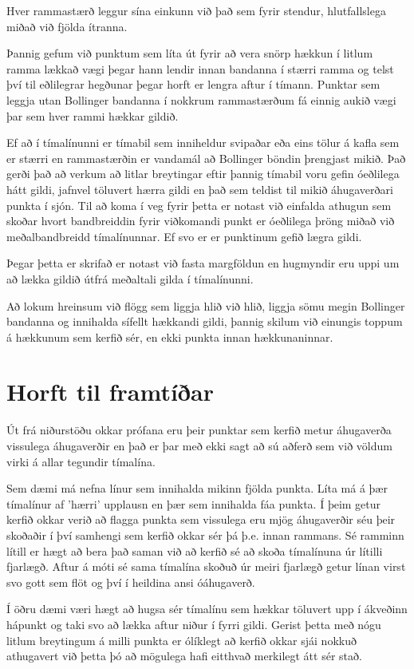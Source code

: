 \documentclass{article}
\begin{document}
Hver rammastærð leggur sína einkunn við það sem fyrir stendur, hlutfallslega miðað við fjölda ítranna.

Þannig gefum við punktum sem líta út fyrir að vera
snörp hækkun í litlum ramma lækkað vægi þegar hann
lendir innan bandanna í stærri ramma
og telst því til eðlilegrar hegðunar þegar horft er
lengra aftur í tímann.
Punktar sem leggja utan Bollinger bandanna í nokkrum
rammastærðum fá einnig aukið vægi þar sem hver rammi
hækkar gildið.

Ef að í tímalínunni er tímabil sem inniheldur svipaðar
eða eins tölur á kafla sem er stærri en rammastærðin er
vandamál að Bollinger 
böndin þrengjast mikið. Það gerði það að verkum að
litlar breytingar eftir þannig tímabil voru gefin
óeðlilega hátt gildi, 
jafnvel töluvert hærra gildi en það sem teldist til
mikið áhugaverðari punkta í sjón. Til að koma í veg
fyrir þetta er notast við
einfalda athugun sem skoðar hvort bandbreiddin fyrir
viðkomandi punkt er óeðlilega þröng miðað við
meðalbandbreidd tímalínunnar.
Ef svo er er punktinum gefið lægra gildi. 

{
  \color{red}
Þegar þetta er skrifað er notast við fasta margföldun en hugmyndir
eru uppi um að lækka 
gildið útfrá meðaltali gilda í tímalínunni.
}

Að lokum hreinsum við flögg sem liggja hlið við hlið,
liggja sömu megin Bollinger bandanna og innihalda
sífellt hækkandi gildi, 
þannig skilum við einungis toppum á hækkunum sem kerfið
sér, en ekki punkta innan hækkunaninnar.

\section{Horft til framtíðar}
Út frá niðurstöðu okkar prófana eru þeir punktar sem kerfið metur
áhugaverða vissulega áhugaverðir en það er þar með ekki sagt að
sú aðferð sem við völdum virki á allar tegundir tímalína. 

Sem dæmi má nefna línur sem innihalda mikinn fjölda punkta.
Líta má á þær tímalínur af 'hærri' upplausn en þær sem innihalda fáa punkta. Í
þeim getur kerfið okkar verið að flagga punkta sem vissulega eru mjög
áhugaverðir séu þeir skoðaðir í því samhengi sem kerfið okkar sér þá þ.e. innan
rammans. Sé ramminn lítill er hægt að bera það saman við að kerfið sé að skoða
tímalínuna úr lítilli fjarlægð. Aftur á móti sé sama tímalína skoðuð úr meiri
fjarlægð getur línan virst svo gott sem flöt og því í heildina ansi óáhugaverð.

Í öðru dæmi væri hægt að hugsa sér tímalínu sem hækkar töluvert upp í ákveðinn
hápunkt og taki svo að lækka aftur niður í fyrri gildi. Gerist þetta með nógu
litlum breytingum á milli punkta er ólíklegt að kerfið okkar sjái nokkuð
athugavert við þetta þó að mögulega hafi eitthvað merkilegt átt sér stað. 
\end{document}
